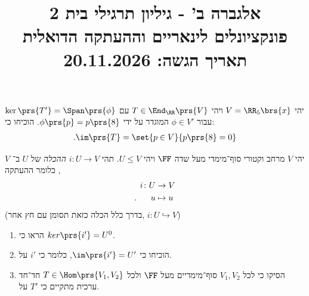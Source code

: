 \documentclass[a4paper,10pt,twoside,openany]{article}
\title{
אלגברה ב' - גיליון תרגילי בית 2 \\
פונקציונלים לינאריים וההעתקה הדואלית
\\
\vspace{1cm}
\large{תאריך הגשה: 20.11.2026}
}
\date{}
\begin{document}
\maketitle

\vspace{-15pt}

\begin{exercise}
יהי
$V = \RR_5\brs{x}$
ויהי
$T \in \End_\RR\prs{V}$
עם
$\ker\prs{T'} = \Span\prs{\phi}$
עבור
$\phi \in V'$
המוגדר על ידי
$\phi\prs{p} = p\prs{8}$.
הוכיחו כי:
\begin{align*}
\text{.} \im\prs{T} = \set{p \in V}{p\prs{8} = 0}
\end{align*}
\end{exercise}

\begin{exercise}
יהי
$V$
מרחב וקטורי סוף־מימדי מעל שדה
$\FF$
ויהי
$U \leq V$.
תהי
$i \colon U \to V$
\emph{ההכלה}
של
$U$
ב־%
$V$,
כלומר ההעתקה
\begin{align*}
i \colon U &\to V \\
\text{.} \hphantom{lala} u &\mapsto u
\end{align*}
(בדרך כלל הכלה כזאת תסומן עם חץ אחר,
$i \colon U \hookrightarrow V$)

\begin{enumerate}
\item הראו כי
$ker\prs{i'} = U^0$.
\item הוכיחו כי
$\im\prs{i'} = U'$,
כלומר כי
$i'$
על.
\item הסיקו כי לכל
$V_1, V_2$
סוף־מימדיים מעל
$\FF$
ולכל
$T \in \Hom\prs{V_1, V_2}$
חד־חד ערכית מתקיים כי
$T'$
על.
\end{enumerate}
\end{exercise}
\end{document}
